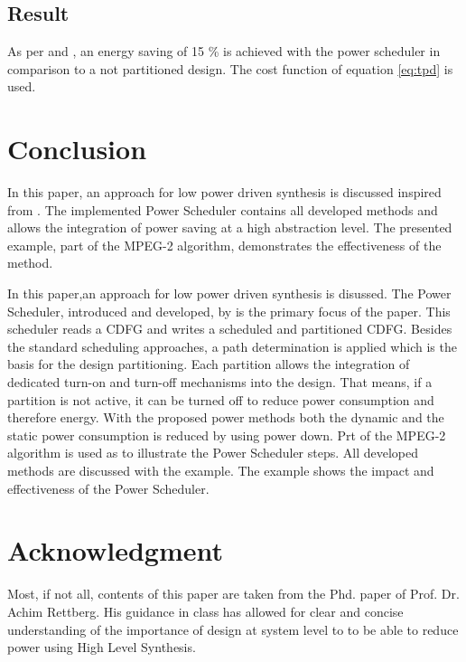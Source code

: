 \documentclass[conference]{IEEEtran}
\begin{document}
\subsection{Result}
As per \cite{10.1007/978-0-387-39362-9_24} and \cite{1581203}, an energy saving of 15 \% is achieved with the power scheduler in comparison to a not partitioned design. The cost function of equation \ref{eq:tpd} is used.


\section{Conclusion}
\label{sec: conclusion}
In this paper, an approach for low power driven synthesis is discussed inspired from \cite{Ret}. The implemented Power Scheduler contains all developed methods and allows the integration of power saving at a high abstraction level. The presented example, part of the MPEG-2 algorithm, demonstrates the effectiveness of the method.

In this paper,an approach for low power driven synthesis is disussed. The Power Scheduler, introduced and developed, by \cite{Ret} is the primary focus of the paper. This scheduler reads a CDFG and writes a scheduled and partitioned CDFG. Besides the standard scheduling approaches, a path determination is applied which is the basis for the design partitioning. Each partition allows the integration of dedicated turn-on and turn-off mechanisms into the design. That means, if a partition is not active, it can be turned off to reduce power consumption and therefore energy. With the proposed power methods both the dynamic and the static power consumption is reduced by using power down. Prt of the MPEG-2 algorithm is used as to illustrate the Power Scheduler steps. All developed methods are discussed with the example. The example shows the impact and effectiveness of the Power Scheduler.
\section*{Acknowledgment}
Most, if not all, contents of this paper are taken from the Phd. paper of Prof. Dr. Achim Rettberg. His guidance in class has allowed for clear and concise understanding of the importance of design at system level to to be able to reduce power using High Level Synthesis.



\printbibliography
\end{document}
